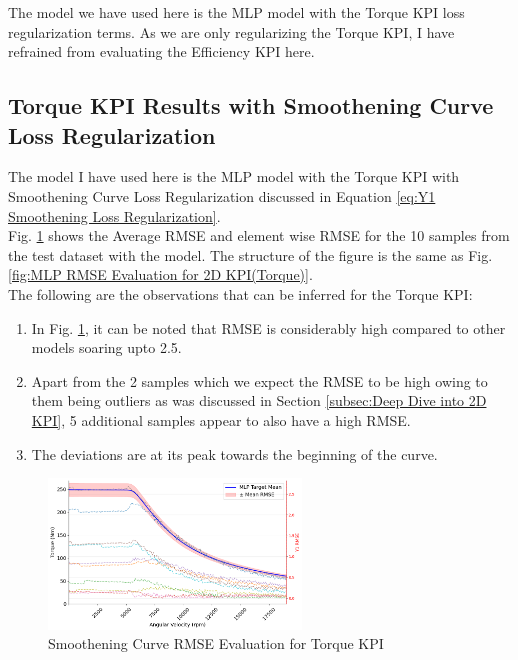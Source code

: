\documentclass{report} %
\begin{document}
The model we have used here is the \ac{MLP} model with the Torque \ac{KPI} loss regularization terms.
As we are only regularizing the Torque \ac{KPI}, I have refrained from evaluating the Efficiency \ac{KPI} here.

\subsection{Torque KPI Results with Smoothening Curve Loss Regularization}\label{subsec:KPI Results with Smoothening curve Loss Regularization}

The model I have used here is the \ac{MLP} model with the Torque \ac{KPI} with Smoothening Curve Loss Regularization discussed in 
Equation \ref{eq:Y1 Smoothening Loss Regularization}. \\
Fig. \ref{fig:Smoothening Torque RMSE Evaluation for 2D KPI(Torque)} shows the Average \ac{RMSE} and element wise \ac{RMSE} for the 10 samples from the test dataset 
with the model. The structure of the figure is the same as Fig. \ref{fig:MLP RMSE Evaluation for 2D KPI(Torque)}.\\

The following are the observations that can be inferred for the Torque \ac{KPI}:
\begin{enumerate}[nosep]
    \item In Fig. \ref{fig:Smoothening Torque RMSE Evaluation for 2D KPI(Torque)}, it can be noted that \ac{RMSE} is considerably high compared to other models soaring upto 
    2.5.
    \item Apart from the 2 samples which we expect the \ac{RMSE} to be high owing to them being outliers as was discussed in Section \ref{subsec:Deep Dive into 2D KPI}, 
    5 additional samples appear to also have a high \ac{RMSE}.
    \item The deviations are at its peak towards the beginning of the curve.
\end{enumerate}

\begin{figure}[H]
    \centering
    \includegraphics[width=0.6\textwidth]{./ReportImages/RMSE_MLP_Smoothening_y1.png} 
    \caption{Smoothening Curve \ac{RMSE} Evaluation for Torque \ac{KPI}} 
    \label{fig:Smoothening Torque RMSE Evaluation for 2D KPI(Torque)}
\end{figure}
\end{document}
